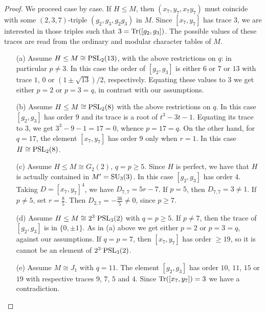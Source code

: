 \documentclass{amsart}
\theoremstyle{remark}
\begin{document}
\begin{proof}
We proceed case by case. If $H\le M$, then $(x_7,y_7,x_7y_7)$ must coincide with some
 $(2,3,7)$-triple $\left(g_2,g_3, g_2g_3\right)$ in $M$.
Since $[x_7,y_7]$ has trace $3$, we are interested in those triples such that $3={{\rm Tr}({[g_2,g_3]})}$. The possible values 
of these traces are read from the ordinary and modular character tables of $M$. 

\begin{itemize}
\item[(\rm{a})] Assume  $H\le M\cong{\mathop{\rm PSL}\nolimits}_2(13)$, with the above restrictions on $q$: in particular $p\ne 3$.
In this case
the order of $[g_2,g_3]$ is either $6$ or $7$ or $13$ with  trace
$1$,  $0$ or $(1\pm \sqrt{13})/2$, respectively.
Equating these values to $3$ we get either $p=2$ or $p=3=q$, in contrast with our assumptions.

\item[(\rm{b})] Assume $H\le M\cong{\mathop{\rm PSL}\nolimits}_2(8)$ with the above restrictions on $q$. 
In this case $[g_2,g_3]$ has order $9$ and its trace is a root of $t^3-3t-1$. 
Equating its trace to $3$, we get $3^3-9-1=17=0$, whence $p=17=q$.
On the other hand, for $q=17$, the element $[x_7,y_7]$ has order $9$ only when $r=1$.
In this case $H\cong {\mathop{\rm PSL}\nolimits}_2(8)$.

\item[(\rm{c})] Assume $H\le M\cong G_2(2)$,  $q=p\ge 5$. Since $H$ is perfect, we 
have that $H$ is actually contained in $M'={\mathop{\rm SU}\nolimits}_3(3)$. In this case $[g_2,g_3]$ has
order $4$. Taking $D=[x_7,y_7]^ 4$, we have $D_{7,7}=5r-7$.
If $p=5$, then $D_{7,7}=3\ne 1$. If $p\neq 5$, set
$r=\frac{8}{5}$. Then $D_{2,7}=-\frac{36}{5}\neq 0$, since $p\geq 7$.

\item[(\rm{d})] Assume $H\le M\cong {2^ 3}^.{\mathop{\rm PSL}\nolimits}_3(2)$ with $q=p\geq 5$.
If $p\neq 7$, then the trace of $[g_2,g_3]$ is in $\{0,\pm 1\}$. As in 
(a) above we  get either $p=2$ or $p=3=q$, against our assumptions.
If $q=p=7$, then  $[x_7,y_7]$ has order $\geq 19$, so it is cannot be an element
of ${2^ 3}^ .{\mathop{\rm PSL}\nolimits}_3(2)$.

\item[(\rm{e})] Assume $M\cong J_1$ with $q=11$.
The element $[g_2,g_3]$ has order $10$, $11$, $15$ or  $19$ with respective traces $9$, $7$, $5$ and $4$.
Since ${{\rm Tr}({[x_7,y_7]})}=3$ we have a contradiction.
\end{itemize}
\end{proof}
\end{document}
